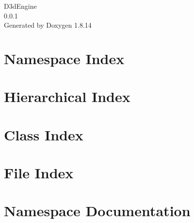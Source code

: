 \documentclass[twoside]{book}
\newcommand{\+}{\discretionary{\mbox{\scriptsize$\hookleftarrow$}}{}{}}
\newcommand{\clearemptydoublepage}{%
  \newpage{\pagestyle{empty}\cleardoublepage}%
}
\begin{document}
\hypersetup{pageanchor=false,
             bookmarksnumbered=true,
             pdfencoding=unicode
            }
\begin{titlepage}
\vspace*{7cm}
\begin{center}%
{\Large D3d\+Engine \\[1ex]\large 0.\+0.\+1 }\\
\vspace*{1cm}
{\large Generated by Doxygen 1.8.14}\\
\end{center}
\end{titlepage}
\clearemptydoublepage
{}
\tableofcontents
\clearemptydoublepage
{}
\hypersetup{pageanchor=true}

\chapter{Namespace Index}

\chapter{Hierarchical Index}

\chapter{Class Index}

\chapter{File Index}

\chapter{Namespace Documentation}


\end{document}
